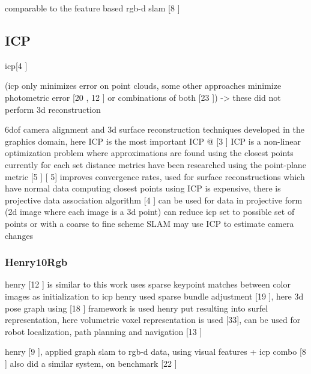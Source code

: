 comparable to the feature based rgb-d slam [8 \cite{Endres12Evaluation}]

\subsection{ICP}

icp[4 \cite{Besl92Method}]

(icp only minimizes error on point clouds, some other approaches minimize photometric error [20 \cite{Steinbrucker11Real}, 12 \cite{Kerl13Robust}] or combinations of both [23 \cite{Tykkala11Direct}]) -> these did not perform 3d reconstruction

6dof camera alignment and 3d surface reconstruction techniques developed in the graphics domain, here ICP is the most important
ICP @ [3 \cite{Besl92Method} ]
ICP is a non-linear optimization problem where approximations are found using the closest points currently for each
set
distance metrics have been researched using the point-plane metric [5 \cite{Chen92Object}]
[\cite{Chen92Object} 5] improves convergence rates, used for surface reconstructions which have normal data
computing closest points using ICP is expensive, there is projective data association algorithm [4 \cite{Blais95Registering}]
can be used for data in projective form (2d image where each image is a 3d point)
can reduce icp set to possible set of points or with a coarse to fine scheme
SLAM may use ICP to estimate camera changes





\subsubsection{Henry10Rgb}

henry [12 \cite{Henry10Rgb,Henry14Rgb}] is similar to this work \cite{Endres12Evaluation}
uses sparse keypoint matches between color images as initialization to icp
henry used sparse bundle adjustment [19 \cite{Lourakis09Sba} ], here 3d pose graph using [18 \cite{Kummerle11G}] framework is used
henry put resulting into surfel representation, here volumetric voxel representation is used [33], can be used for robot localization, path planning and navigation [13 \cite{Hornung10Humanoid}]

henry [9 \cite{Henry10Rgb}], applied graph slam to rgb-d data, using visual features + icp combo [8 \cite{Endres11Evaluation} ] also did a similar system, on benchmark [22 \cite{Sturm12Benchmark}]


